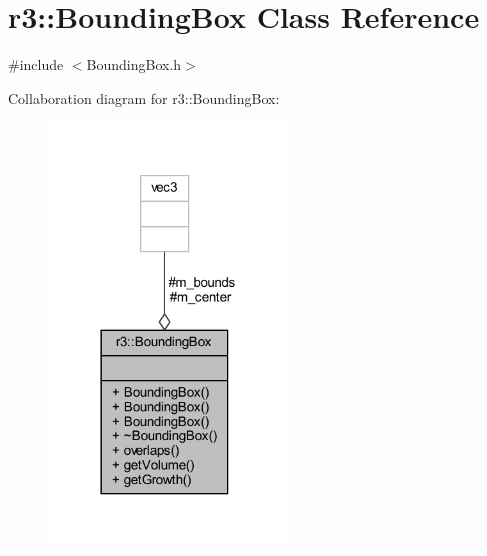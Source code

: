 \hypertarget{classr3_1_1_bounding_box}{}\section{r3\+:\+:Bounding\+Box Class Reference}
\label{classr3_1_1_bounding_box}


{\ttfamily \#include $<$Bounding\+Box.\+h$>$}



Collaboration diagram for r3\+:\+:Bounding\+Box\+:\nopagebreak
\begin{figure}[H]
\begin{center}
\leavevmode
\includegraphics[width=182pt]{classr3_1_1_bounding_box__coll__graph}
\end{center}
\end{figure}
